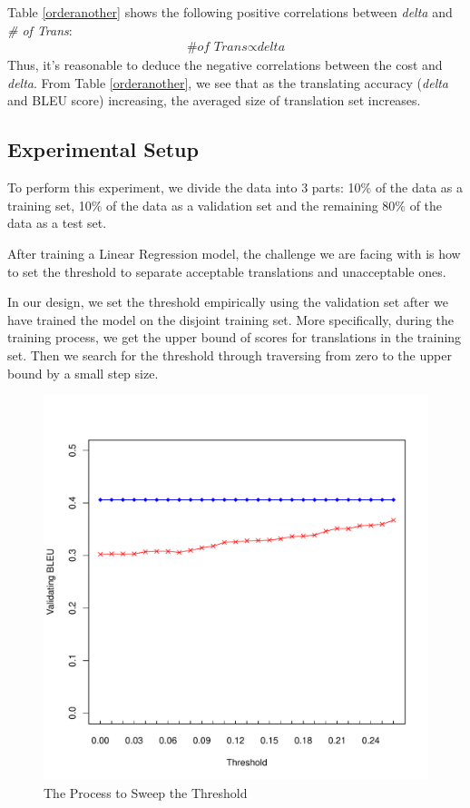\documentclass[11pt]{article}
\begin{document}
Table \ref{orderanother} shows the following positive correlations between  \textit{delta} and \textit{\# of Trans}: 
\begin{align*}
\textit{\# of Trans} \propto \textit{delta} 
\end{align*}
Thus, it's reasonable to deduce the negative correlations between the cost and \textit{delta}.  From Table \ref{orderanother}, we see that as the  translating accuracy (\textit{delta} and BLEU score) increasing, the averaged size of translation set increases.  
 \subsection{Experimental Setup}
 
 To perform this experiment, we divide the data into 3 parts: 10$\%$ of the data as a training set, 10$\%$ of the data as a validation set and the remaining 80$\%$ of the data as a test set. 

After  training  a Linear Regression model, the challenge we are facing with is how to set the threshold to separate acceptable translations and unacceptable ones. 
 
 
 In our design, we set the threshold empirically using the validation set after we have trained the model on the disjoint training set. More specifically, during the training process, we get the upper bound of scores for translations in the training set. Then we search for the threshold through traversing from  zero to the upper bound by a small step size. %
 
 \begin{figure}[htbp]
  \centering
  \includegraphics[width=\linewidth]{WorkerSelection/bleuthreshold.pdf}
  \caption{The Process to Sweep the Threshold}
    \label{fsweepthre}
\end{figure}
\end{document}
